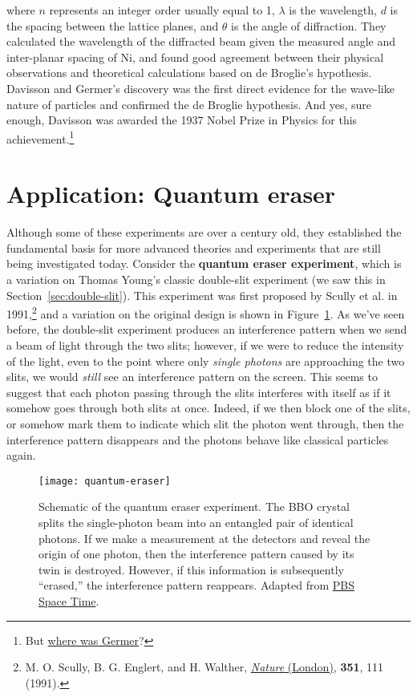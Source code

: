 where $n$ represents an integer order usually equal to 1, $\lambda$ is the wavelength, $d$ is the spacing between the lattice planes, and $\theta$ is the angle of diffraction. They calculated the wavelength of the diffracted beam given the measured angle and inter-planar spacing of Ni, and found good agreement between their physical observations and theoretical calculations based on de Broglie's hypothesis. Davisson and Germer's discovery was the first direct evidence for the wave-like nature of particles and confirmed the de Broglie hypothesis. And yes, sure enough, Davisson was awarded the 1937 Nobel Prize in Physics for this achievement.\footnote{But \href{http://www.nobelprize.org/nobel\_prizes/physics/laureates/1937/press.html}{where was Germer}?}


\section{Application: Quantum eraser}
Although some of these experiments are over a century old, they established the fundamental basis for more advanced theories and experiments that are still being investigated today. Consider the \textbf{quantum eraser experiment}, which is a variation on Thomas Young's classic double-slit experiment (we saw this in Section~\ref{sec:double-slit}). This experiment was first proposed by Scully et al. in 1991,\footnote{M. O. Scully, B. G. Englert, and H. Walther, \href{https://www.nature.com/nature/journal/v351/n6322/abs/351111a0.html}{\emph{Nature} (London)}, \textbf{351}, 111 (1991).} and a variation on the original design is shown in Figure~\ref{fig:QE}. As we've seen before, the double-slit experiment produces an interference pattern when we send a beam of light through the two slits; however, if we were to reduce the intensity of the light, even to the point where only \emph{single photons} are approaching the two slits, we would \emph{still} see an interference pattern on the screen. This seems to suggest that each photon passing through the slits interferes with itself as if it somehow goes through both slits at once. Indeed, if we then block one of the slits, or somehow mark them to indicate which slit the photon went through, then the interference pattern disappears and the photons behave like classical particles again. \par

\begin{figure}[!h]
	\centering
	\texttt{[image: quantum-eraser]}
	\caption{Schematic of the quantum eraser experiment. The BBO crystal splits the single-photon beam into an entangled pair of identical photons. If we make a measurement at the detectors and reveal the origin of one photon, then the interference pattern caused by its twin is destroyed. However, if this information is subsequently ``erased,'' the interference pattern reappears. Adapted from \href{http://www.pbs.org/video/2365862119/}{PBS Space Time}.}
	\label{fig:QE}
\end{figure}

